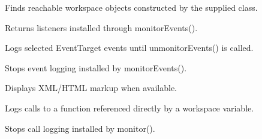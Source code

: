\documentclass[12pt,a4paper]{article}
\begin{document}
\noindent Finds reachable workspace objects constructed by the supplied class.

\vspace{5mm}
\noindent {}


\noindent Returns listeners installed through monitorEvents().

\vspace{5mm}
\noindent {}


\noindent Logs selected EventTarget events until unmonitorEvents() is called.

\vspace{5mm}
\noindent {}


\noindent Stops event logging installed by monitorEvents().

\vspace{5mm}
\noindent {}


\noindent Displays XML/HTML markup when available.

\vspace{5mm}
\noindent {}


\noindent Logs calls to a function referenced directly by a workspace variable.

\vspace{5mm}
\noindent {}


\noindent Stops call logging installed by monitor().

\vspace{5mm}
\noindent {}
\end{document}
